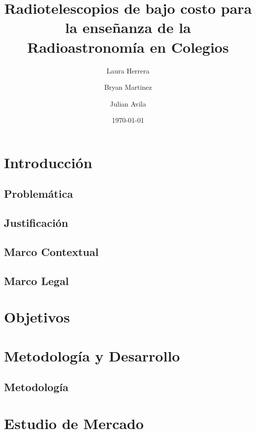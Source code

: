 \documentclass[sn-mathphys]{svmono}
\title{\Huge \textbf{Radiotelescopios de bajo costo para la enseñanza de la Radioastronomía en Colegios}}
\author{Laura Herrera \and Bryan Martinez \and Julian Avila}
\date{\today}
\begin{document}
\maketitle

\tableofcontents

\newpage

\chapter{Introducción}
\section{Problemática}


\section{Justificación}


\section{Marco Contextual}


\section{Marco Legal}


\chapter{Objetivos}


\chapter{Metodología y Desarrollo}


\section{Metodología}



\chapter{Estudio de Mercado}%
\label{cha:Estudio de Mercado}
\end{document}
